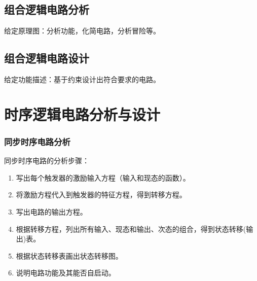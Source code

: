 \documentclass{article}
\begin{document}
	\subsection{组合逻辑电路分析}
	给定原理图：分析功能，化简电路，分析冒险等。
	\subsection{组合逻辑电路设计}
	给定功能描述：基于约束设计出符合要求的电路。
	
	\section{时序逻辑电路分析与设计}
	\subsubsection{同步时序电路分析}
	同步时序电路的分析步骤：
	\begin{enumerate}
		\item 写出每个触发器的激励输入方程（输入和现态的函数）。
		\item 将激励方程代入到触发器的特征方程，得到转移方程。
		\item 写出电路的输出方程。
		\item 根据转移方程，列出所有输入、现态和输出、次态的组合，得到状态转移(输出)表。
		\item 根据状态转移表画出状态转移图。
		\item 说明电路功能及其能否自启动。
	\end{enumerate}
\end{document}
